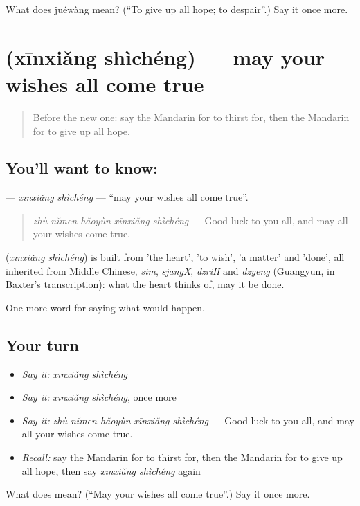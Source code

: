 \begin{tcolorbox}[breakable,colback=teal!4,colframe=teal!35!black,title={Before you move on}]
What does juéwàng mean? (\textquotedblleft{}To give up all hope; to despair\textquotedblright{}.) Say it once more.
\end{tcolorbox}
\section[\texorpdfstring{\zh{心想事成} (xīnxiǎng shìchéng)}{心想事成 (xīnxiǎng shìchéng)}]{ (xīnxiǎng shìchéng) — may your wishes all come true}

\label{lesson:ZH-C533-xinxiangshicheng}



\begin{quote}
Before the new one: say the Mandarin for to thirst for, then the Mandarin for to give up all hope.
\end{quote}

\subsection*{You'll want to know: }
\textbf{} — \emph{xīnxiǎng shìchéng} — \textquotedblleft{}may your wishes all come true\textquotedblright{}.

\begin{quote}
\textbf{} \emph{zhù nǐmen hǎoyùn xīnxiǎng shìchéng} — Good luck to you all, and may all your wishes come true.
\end{quote}

\begin{cousinweb}
\textbf{} (\emph{xīnxiǎng shìchéng}) is built from  'the heart',  'to wish',  'a matter' and  'done', all inherited from Middle Chinese, \emph{sim}, \emph{sjangX}, \emph{dzriH} and \emph{dzyeng} (Guangyun, in Baxter's transcription): what the heart thinks of, may it be done.
\end{cousinweb}

\begin{grammarlens}[title={What you've built}]
One more word for saying what would happen.
\end{grammarlens}

\subsection*{Your turn}
\begin{itemize}
\raggedright
  \item \emph{Say it:} \emph{xīnxiǎng shìchéng}
  \item \emph{Say it:} \emph{xīnxiǎng shìchéng}, once more
  \item \emph{Say it:} \emph{zhù nǐmen hǎoyùn xīnxiǎng shìchéng} — Good luck to you all, and may all your wishes come true.
  \item \emph{Recall:} say the Mandarin for to thirst for, then the Mandarin for to give up all hope, then say \emph{xīnxiǎng shìchéng} again
\end{itemize}

\begin{tcolorbox}[breakable,colback=teal!4,colframe=teal!35!black,title={Before you move on}]
What does  mean? (\textquotedblleft{}May your wishes all come true\textquotedblright{}.) Say it once more.
\end{tcolorbox}
